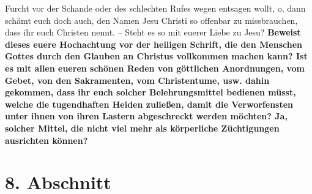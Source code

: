 {Furcht vor der Schande oder des schlechten Rufes wegen entsagen wollt, o, dann
schämt euch doch auch, den Namen Jesu Christi so offenbar zu missbrauchen, dass
ihr euch Christen nennt. -- Steht es so mit euerer Liebe zu Jesu?
\textbf{Beweist dieses
euere Hochachtung vor der heiligen Schrift, die den
Menschen Gottes durch den
Glauben an Christus vollkommen machen kann? Ist es mit allen eueren schönen
Reden von göttlichen Anordnungen, vom Gebet, von den
Sakramenten, vom
Christentume, usw. dahin gekommen, dass ihr euch solcher Belehrungsmittel
bedienen müsst, welche die tugendhaften Heiden zuließen, damit die
Verworfensten unter ihnen von ihren Lastern abgeschreckt werden möchten? Ja,
solcher Mittel, die nicht viel mehr als körperliche Züchtigungen ausrichten
können?}
\label{ref:17_07_einwand_ende}

\section{8. Abschnitt} \label{kap17_ab8}

}
